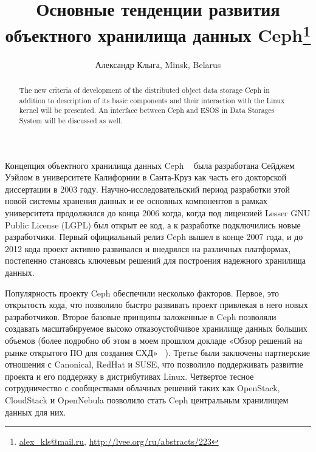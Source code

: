 \documentclass[10pt, a5paper]{article}
\begin{document}
\title{Основные тенденции развития объектного хранилища данных Ceph\footnote{\url{alex_kls@mail.ru}, \url{http://lvee.org/ru/abstracts/223}}}
\author{Александр Клыга, Minsk, Belarus}
\maketitle
\begin{abstract}
The new criteria of development of the distributed object data storage Ceph in addition to description of its basic components and their interaction with the Linux kernel will be presented. An interface between Ceph and ESOS in Data Storages System will be discussed as well.
\end{abstract}
Концепция объектного хранилища данных Ceph ~\cite{Kliga1} была разработана Сейджем Уэйлом в университете Калифорнии в Санта-Круз как часть его докторской диссертации в 2003 году. \linebreak Научно-исследовательский период разработки этой новой системы хранения данных и ее основных компонентов в рамках университета продолжился до конца 2006 когда, когда  под лицензией Lesser GNU Public License (LGPL) был открыт ее код, а к разработке подключились новые разработчики. Первый официальный релиз Ceph вышел в конце 2007 года, и до 2012 кода проект активно развивался и внедрялся на различных платформах, постепенно становясь ключевым решений для построения надежного хранилища данных.

Популярность проекту Ceph обеспечили несколько факторов. Первое, это открытость кода, что позволило быстро развивать проект привлекая в него новых разработчиков. Второе базовые принципы заложенные в Ceph позволяли создавать масштабируемое высоко отказоустойчивое  хранилище данных больших объемов (более подробно об этом в моем прошлом докладе «Обзор решений на рынке открытого ПО для создания СХД» ~\cite{Kliga2}). Третье были заключены  партнерские отношения с Canonical, RedHat и SUSE, что позволило поддерживать развитие проекта и его поддержку в дистрибутивах Linux. Четвертое тесное сотрудничество с сообществами облачных решений таких как OpenStack, CloudStack и OpenNebula позволило стать Ceph центральным хранилищем данных для них.
\end{document}
